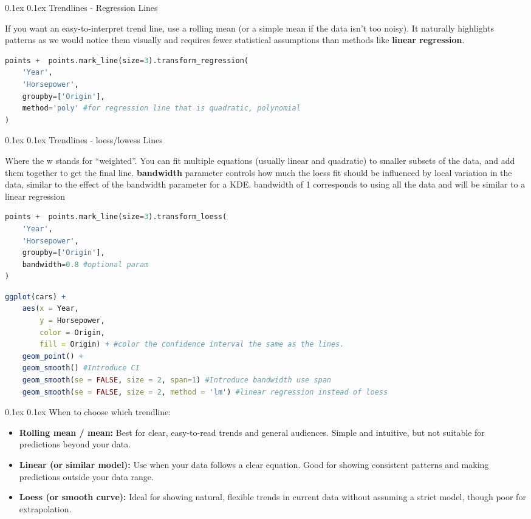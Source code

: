 \documentclass[8pt,landscape]{article}
\makeatletter
\renewcommand{\subsection}{\@startsection{subsection}{2}{0pt}%
    {0.1ex}%
    {0.1ex}%
    {\fontsize{8}{9}\bfseries\color{blue}}} %
\newcommand{\smalltext}[1]{%
  {\fontsize{8}{9}\selectfont\sloppy #1\par}%
}
\makeatother
\begin{document}
\begin{multicols}{3}
\subsection{Trendlines - Regression Lines}
\smalltext{
If you want an easy-to-interpret trend line, use a rolling mean 
(or a simple mean if the data isn’t too noisy). It naturally 
highlights patterns as we would notice them visually and requires fewer 
statistical assumptions than methods like \textbf{linear regression}. 
}
\begin{lstlisting}[language=Python]
points +  points.mark_line(size=3).transform_regression(
    'Year',
    'Horsepower',
    groupby=['Origin'],
    method='poly' #for regression line that is quadratic, polynomial
)
\end{lstlisting}

\subsection{Trendlines - loess/lowess Lines}
\smalltext{
Where the w stands for “weighted”. You can fit multiple equations (usually linear and quadratic) to smaller subsets of the data, and add them together to get the final line. 
\textbf{bandwidth} parameter controls how much the loess fit should be influenced by local variation in the data, similar to the effect of the bandwidth parameter for a KDE.
bandwidth of 1 corresponds to using all the data and will be similar to a linear regression
}
\begin{lstlisting}[language=Python]
points +  points.mark_line(size=3).transform_loess(
    'Year',
    'Horsepower',
    groupby=['Origin'],
    bandwidth=0.8 #optional param
)
\end{lstlisting}
\begin{lstlisting}[language=R]
ggplot(cars) + 
    aes(x = Year,
        y = Horsepower,
        color = Origin,
        fill = Origin) + #color the confidence interval the same as the lines.
    geom_point() +
    geom_smooth() #Introduce CI
    geom_smooth(se = FALSE, size = 2, span=1) #Introduce bandwidth use span
    geom_smooth(se = FALSE, size = 2, method = 'lm') #linear regression instead of loess
\end{lstlisting}
\subsection{When to choose which trendline:}
\begin{itemize}
    \item \textbf{Rolling mean / mean:} Best for clear, easy-to-read trends and general audiences. Simple and intuitive, but not suitable for predictions beyond your data.
    \item \textbf{Linear (or similar model):} Use when your data follows a clear equation. Good for showing consistent patterns and making predictions outside your data range.
    \item \textbf{Loess (or smooth curve):} Ideal for showing natural, flexible trends in current data without assuming a strict model, though poor for extrapolation.
\end{itemize}


\end{multicols}
\end{document}
